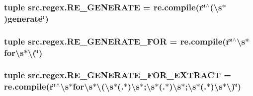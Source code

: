 \hypertarget{namespacesrc_1_1regex_ad055c3a6fb834d0a285136d0256b33f8}{
\subsubsection[{R\-E\-\_\-\-G\-E\-N\-E\-R\-A\-T\-E}]{\setlength{\rightskip}{0pt plus 5cm}tuple src.\-regex.\-R\-E\-\_\-\-G\-E\-N\-E\-R\-A\-T\-E = re.\-compile(r\char`\"{}$^\wedge$(\textbackslash{}s$\ast$)generate\char`\"{})}}\label{namespacesrc_1_1regex_ad055c3a6fb834d0a285136d0256b33f8}
\hypertarget{namespacesrc_1_1regex_aea898f2c869223fb544c3f4127677ac9}{
\subsubsection[{R\-E\-\_\-\-G\-E\-N\-E\-R\-A\-T\-E\-\_\-\-F\-O\-R}]{\setlength{\rightskip}{0pt plus 5cm}tuple src.\-regex.\-R\-E\-\_\-\-G\-E\-N\-E\-R\-A\-T\-E\-\_\-\-F\-O\-R = re.\-compile(r\char`\"{}$^\wedge$\textbackslash{}s$\ast$for\textbackslash{}s$\ast$\textbackslash{}(\char`\"{})}}\label{namespacesrc_1_1regex_aea898f2c869223fb544c3f4127677ac9}
\hypertarget{namespacesrc_1_1regex_ac0c168590e9df99c91ca4c1951212419}{
\subsubsection[{R\-E\-\_\-\-G\-E\-N\-E\-R\-A\-T\-E\-\_\-\-F\-O\-R\-\_\-\-E\-X\-T\-R\-A\-C\-T}]{\setlength{\rightskip}{0pt plus 5cm}tuple src.\-regex.\-R\-E\-\_\-\-G\-E\-N\-E\-R\-A\-T\-E\-\_\-\-F\-O\-R\-\_\-\-E\-X\-T\-R\-A\-C\-T = re.\-compile(r\char`\"{}$^\wedge$\textbackslash{}s$\ast$for\textbackslash{}s$\ast$\textbackslash{}(\textbackslash{}s$\ast$(.$\ast$)\textbackslash{}s$\ast$;\textbackslash{}s$\ast$(.$\ast$)\textbackslash{}s$\ast$;\textbackslash{}s$\ast$(.$\ast$)\textbackslash{}s$\ast$\textbackslash{})\char`\"{})}}\label{namespacesrc_1_1regex_ac0c168590e9df99c91ca4c1951212419}
